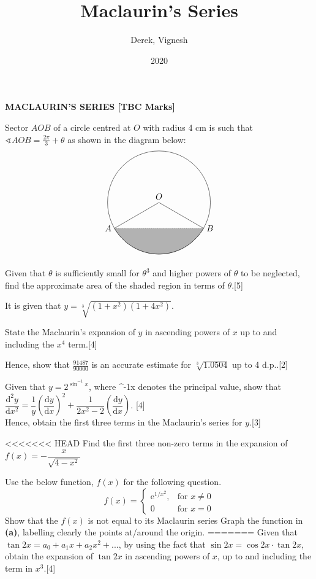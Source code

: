 \documentclass[12pt, a4 paper]{article}
\title{Maclaurin's Series}
\author{Derek, Vignesh}
\date{2020}
\begin{document}
\maketitle

\textbf{MACLAURIN'S SERIES [TBC Marks]}
\begin{outline}[enumerate]
\1 Sector $AOB$ of a circle centred at $O$ with radius 4 cm is such that $\sphericalangle AOB = \frac{2\pi}{3}+\theta$ as shown in the diagram below: %
\[
\begin{tikzpicture}
  \draw (0,0) node[above]{$O$} circle (60pt);
  \draw (-51.96152pt,-30pt) node[left]{$A$} -- (0,0);
  \draw (51.96152pt,-30pt) node[right]{$B$} -- (0,0);
  \filldraw[color=white!70!black,draw=black] (-51.96152pt,-30pt) arc (210:330:60pt);
  \draw[dotted](-51.96152pt,-30pt) -- (51.96152pt,-30pt);
\end{tikzpicture}
\]
Given that $\theta$ is sufficiently small for $\theta^3$ and higher powers of $\theta$ to be neglected, find the approximate area of the shaded region in terms of $\theta$.\hfill[5]

\1 It is given that $y=\sqrt[3]{(1+x^2)(1+4x^2)}$. %

  \2 State the Maclaurin's expansion of $y$ in ascending powers of $x$ up to and including the $x^4$ term.\hfill[4]

  \2 Hence, show that $\frac{91487}{90000}$ is an accurate estimate for $\sqrt[3]{1.0504}$  up to 4 d.p..\hfill[2]

\1 Given that $y=2^{\sin^{-1}{x}}$, where \sin^{-1}{x} denotes the principal value, show that $\dfrac{\mathrm{d}^2y}{\mathrm{d}x^2}=\dfrac{1}{y}\left(\dfrac{\mathrm{d}y}{\mathrm{d}x}\right)^2+\dfrac{1}{2x^2-2}\left(\dfrac{\mathrm{d}y}{\mathrm{d}x}\right)$. \hfill[4] \\
Hence, obtain the first three terms in the Maclaurin's series for $y$.\hfill[3] %

<<<<<<< HEAD
\1 Find the first three non-zero terms in the expansion of $f(x)=-\dfrac{x}{\sqrt{4-x^2}}$

\1 Use the below function, $f(x)$ for the following question.
\begin{equation*}
  f(x) = \begin{cases}
   \mathrm{e}^{1/x^2},  & \textrm{for }  x\neq0                       \\
  0 & \textrm{for } x=0
  \end{cases}
\end{equation*}
\2 Show that the $f(x)$ is not equal to its Maclaurin series
\2 Graph the function in \textbf{(a)}, labelling clearly the points at/around the origin.
=======
\1 Given that $\tan{2x}=a_{0}+a_{1}x+a_{2}x^2+...$, by using the fact that $\sin{2x}=\cos{2x}\cdot \tan{2x}$, obtain the expansion of $\tan{2x}$ in ascending powers of $x$, up to and including the term in $x^3$.\hfill[4] %


\end{outline}
\end{document}
